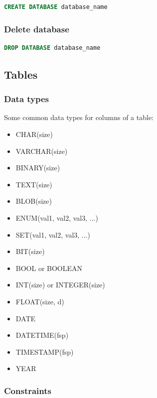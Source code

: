 \documentclass{article}
\begin{document}
\vspace{8pt} \begin{lstlisting}[language=SQL]
CREATE DATABASE database_name
\end{lstlisting} \vspace{8pt}

\subsubsection{Delete database}
\vspace{8pt} \begin{lstlisting}[language=SQL]
DROP DATABASE database_name
\end{lstlisting} \vspace{8pt}

\subsection{Tables}
\subsubsection{Data types}

Some common data types for columns of a table:
\begin{multicols}{2}
\begin{itemize}
    \item CHAR(size)
    \item VARCHAR(size)
    \item BINARY(size)
    \item TEXT(size)
    \item BLOB(size)
    \item ENUM(val1, val2, val3, ...)
    \item SET(val1, val2, val3, ...)
    \item BIT(size)
    \item BOOL or BOOLEAN
    \item INT(size) or INTEGER(size)
    \item FLOAT(size, d)
    \item DATE
    \item DATETIME(fsp)
    \item TIMESTAMP(fsp)
    \item YEAR
\end{itemize}
\end{multicols}

\subsubsection{Constraints}
\end{document}
